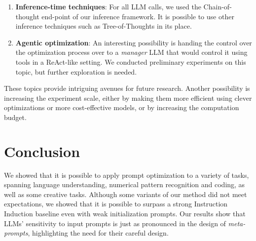 \begin{enumerate}
    \item \textbf{Inference-time techniques}: For all LLM calls, we used the Chain-of-thought end-point of our inference framework. It is possible to use other inference techniques such as Tree-of-Thoughts in its place.
    \item \textbf{Agentic optimization}: An interesting possibility is handing the control over the optimization process over to a \textit{manager} LLM that would control it using tools in a ReAct-like setting. We conducted preliminary experiments on this topic, but further exploration is needed. 
\end{enumerate}

These topics provide intriguing avenues for future research. Another possibility is increasing the experiment scale, either by making them more efficient
using clever optimizations or more cost-effective models, or by increasing the computation budget. 

\section{Conclusion}
We showed that it is possible to apply prompt optimization to a variety of tasks, spanning language understanding, numerical pattern recognition and coding, as well as some creative tasks.
Although some variants of our method did not meet expectations, we showed that it is possible to surpass a strong Instruction Induction baseline even with weak initialization prompts. 
Our results show that LLMs' sensitivity to input prompts is just as pronounced in the design of \textit{meta-prompts}, highlighting the need for their careful design.
